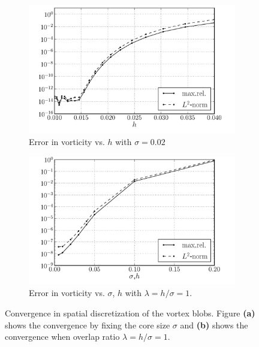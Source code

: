 	\begin{figure}[!t]
	        \centering
	        \begin{subfigure}[b]{0.47\textwidth}
	                \includegraphics[width=\textwidth]{figures/lagrangian/lambOseen_convergence_dx_sigma0p02_compressed.pdf}
	                \caption{Error in vorticity vs. $h$ with $\sigma = 0.02$}
	                \label{fig:lambOseen_convergence_dx_sigma0p02_compressed}
	        \end{subfigure}%
	        \qquad %
	        \begin{subfigure}[b]{0.47\textwidth}
	                \includegraphics[width=\textwidth]{figures/lagrangian/lambOseen_convergence_dx_compressed.pdf}
	                \caption{Error in vorticity vs. $\sigma$, $h$ with $\lambda=h/\sigma=1$.}
	                \label{fig:lambOseen_convergence_dx_compressed}
	        \end{subfigure}
	        \caption{Convergence in spatial discretization of the vortex blobs. Figure \textbf{(a)} shows the convergence by fixing the core size $\sigma$ and \textbf{(b)} shows the convergence when overlap ratio $\lambda = h/\sigma = 1$.}
	        \label{fig:lambOseen_convergence_dx}
	\end{figure}


